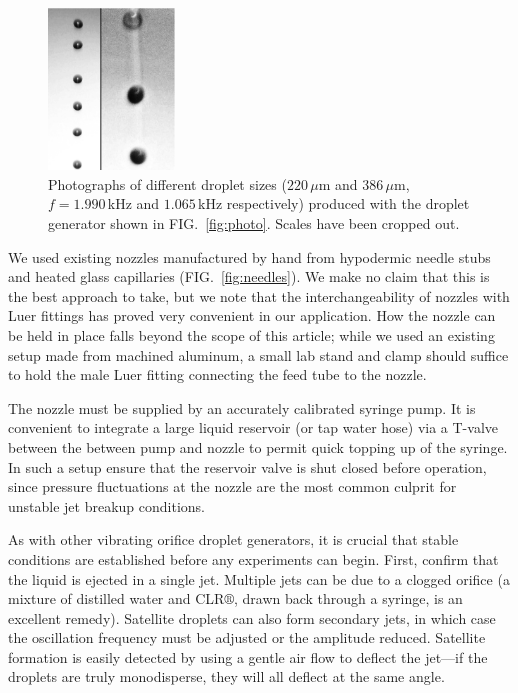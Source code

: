 \documentclass[aip,rsi,reprint,graphicx]{revtex4-1} %
\begin{document}
\begin{figure}
\centering
\includegraphics[width=0.3\textwidth]{hdg_images/photo.eps}
\caption{Photographs of different droplet sizes ($220\,\mu$m and $386\,\mu$m,
    $f=1.990\,$kHz and $1.065\,$kHz respectively) produced with the droplet
generator shown in FIG.~\ref{fig:photo}. Scales have been cropped out. \label{fig:dropphoto}}
\end{figure}
We used existing nozzles manufactured by hand from hypodermic needle stubs and
heated glass capillaries (FIG.~\ref{fig:needles}). We make no claim that this is
the best approach to take, but we note that the interchangeability of nozzles
with Luer fittings has proved very convenient in our application. How the nozzle
can be held in place falls beyond the scope of this article; while we used an
existing setup made from machined aluminum, a small lab stand and clamp should
suffice to hold the male Luer fitting connecting the feed tube to the nozzle.

The nozzle must be supplied by an accurately calibrated syringe pump. It is
convenient to integrate a large liquid reservoir (or tap water hose) via a
T-valve between the between pump and nozzle to permit quick topping up of the
syringe. In such a setup ensure that the reservoir valve is shut closed before operation,
since pressure fluctuations at the nozzle are the most common culprit for
unstable jet breakup conditions.

As with other vibrating orifice droplet generators, it is crucial that stable
conditions are established before any experiments can begin. First, confirm that
the liquid is ejected in a single jet. Multiple jets can be due to a clogged
orifice (a mixture of distilled water and CLR$\circledR$, drawn back through a
syringe, is an excellent remedy). Satellite droplets can also form secondary
jets, in which case the oscillation frequency must be adjusted or the amplitude
reduced. Satellite formation is easily detected by using a gentle air flow to
deflect the jet---if the droplets are truly monodisperse, they will all deflect
at the same angle.\cite{Strom69}
\end{document}

